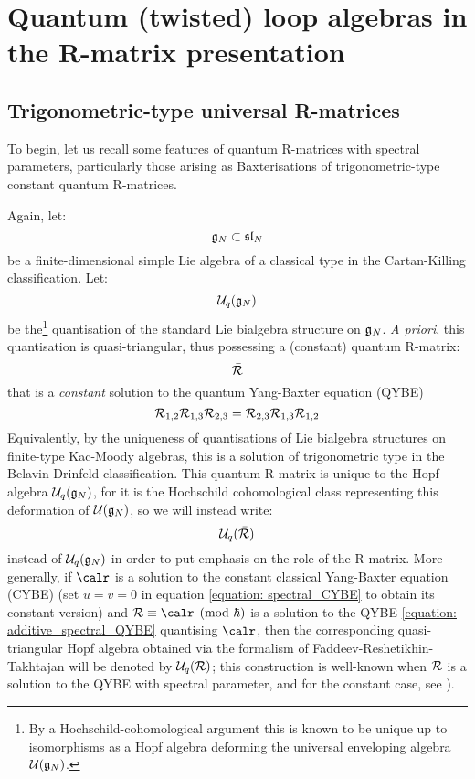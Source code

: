 \section{Quantum (twisted) loop algebras in the R-matrix presentation}
    \subsection{Trigonometric-type universal R-matrices}
        To begin, let us recall some features of quantum R-matrices with spectral parameters, particularly those arising as Baxterisations of trigonometric-type constant quantum R-matrices. 
    
        Again, let:
            $$\mathfrak{g}_N \subset \mathfrak{sl}_N$$
        be a finite-dimensional simple Lie algebra of a classical type in the Cartan-Killing classification. Let:
            $$\mathcal{U}_q(\mathfrak{g}_N)$$
        be the\footnote{By a Hochschild-cohomological argument this is known to be unique up to isomorphisms as a Hopf algebra deforming the universal enveloping algebra $\mathcal{U}(\mathfrak{g}_N)$.} quantisation of the standard Lie bialgebra structure on $\mathfrak{g}_N$. \textit{A priori}, this quantisation is quasi-triangular, thus possessing a (constant) quantum R-matrix:
            $$\bar{\mathcal{R}}$$
        that is a \textit{constant} solution to the quantum Yang-Baxter equation (QYBE)
            \begin{equation} \label{equation: constant_QYBE}
                \mathcal{R}_{1, 2} \mathcal{R}_{1, 3} \mathcal{R}_{2, 3} = \mathcal{R}_{2, 3} \mathcal{R}_{1, 3} \mathcal{R}_{1, 2}
            \end{equation}
        Equivalently, by the uniqueness of quantisations of Lie bialgebra structures on finite-type Kac-Moody algebras, this is a solution of trigonometric type in the Belavin-Drinfeld classification. This quantum R-matrix is unique to the Hopf algebra $\mathcal{U}_q(\mathfrak{g}_N)$, for it is the Hochschild cohomological class representing this deformation of $\mathcal{U}(\mathfrak{g}_N)$, so we will instead write:
            $$\mathcal{U}_q(\bar{\mathcal{R}})$$
        instead of $\mathcal{U}_q(\mathfrak{g}_N)$ in order to put emphasis on the role of the R-matrix. More generally, if $\calr$ is a solution to the constant classical Yang-Baxter equation (CYBE) (set $u = v = 0$ in equation \eqref{equation: spectral_CYBE} to obtain its constant version) and $\calR \equiv \calr \pmod{\hbar}$ is a solution to the QYBE \eqref{equation: additive_spectral_QYBE} quantising $\calr$, then the corresponding quasi-triangular Hopf algebra obtained via the formalism of Faddeev-Reshetikhin-Takhtajan will be denoted by $\mathcal{U}_q(\mathcal{R})$; this construction is well-known when $\mathcal{R}$ is a solution to the QYBE with spectral parameter, and for the constant case, see \cite{gautam_rupert_wendlandt_R_matrix_presentation_for_finite_QUEs}).
    
